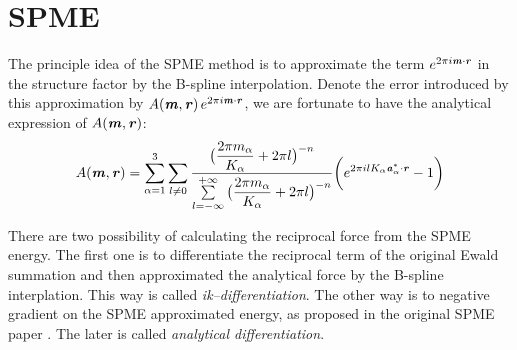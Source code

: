 \documentclass[aps,pre,preprint]{revtex4-1}
\renewcommand{\v}[1]{\textbf{\textit{#1}}}
\begin{document}




\section{SPME}

The principle idea of the SPME method is to approximate the term
$e^{2\pi i\v m\cdot\v r}$ in the structure factor by the B-spline
interpolation. Denote the error introduced by this approximation by
$A(\v m, \v r)\,e^{2\pi i\v m\cdot \v r}$, we are fortunate to have
the analytical expression of $A(\v m, \v r)$:
\begin{align}
  A(\v m, \v r)
  =
  \sum_{\alpha=1}^3\sum_{l\neq 0}
  \frac
  {\big(\dfrac{2\pi m_\alpha}{K_\alpha} + 2\pi l\big)^{-n}}
  {\sum\limits_{l=-\infty}^{+\infty}
    \big(\dfrac{2\pi m_\alpha}{K_\alpha} + 2\pi l\big)^{-n}}
  \bigg(
  e^{2\pi i l K_\alpha\v a^\ast_\alpha\cdot \v r} - 1
  \bigg)
\end{align}

There are two possibility of calculating the reciprocal force from the
SPME energy. The first one is to differentiate the reciprocal term of
the original Ewald summation and then approximated the analytical
force by the B-spline interplation. This way is called
\emph{ik--differentiation}. The other way is to negative gradient on
the SPME approximated energy, as proposed in the original SPME paper
\cite{essmann1995spm}. The later is called \emph{analytical
differentiation}.
\end{document}

